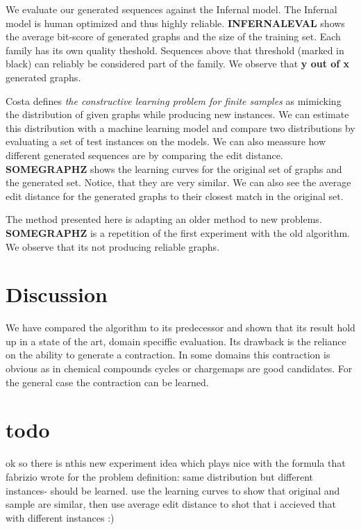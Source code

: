 \documentclass{article}
\begin{document}
We evaluate our generated sequences against the Infernal model.
The Infernal model is human optimized and thus highly reliable.
 \textbf{INFERNALEVAL} shows the average bit-score of generated graphs
and the size of the training set. Each family has its own quality theshold.
Sequences above that threshold (marked in black) can reliably be considered
part of the family. We observe that \textbf{y out of x} generated graphs.

Costa \cite{costa14} defines \emph{the constructive learning problem for finite samples} 
as mimicking the distribution of given graphs while producing new instances.
We can estimate this distribution with a machine learning
model and compare two distributions by evaluating a set of test instances
on the models. We can also meassure how different generated sequences
are by comparing the edit distance.
\textbf{SOMEGRAPHZ} shows the learning curves for the original set
of graphs and the generated set. Notice, that they are very similar.
We can also see the average edit distance for the generated graphs 
to their closest match in the original set.

The method presented here is adapting an older method to new problems.
\textbf{SOMEGRAPHZ} is a repetition of the first experiment with 
the old algorithm. We observe that its not producing reliable
graphs.

\section{Discussion} 
We have compared the algorithm to its predecessor and shown
that its result hold up in a state of the art, domain speciffic
evaluation. Its drawback is the reliance on the ability to 
generate a contraction. In some domains this contraction is 
obvious as in chemical compounds cycles or chargemaps are good candidates.
For the general case the contraction can be learned.

\section{todo}
ok so there is nthis new experiment idea which plays nice with 
the formula that fabrizio wrote for the problem definition:
same distribution but different instances- should be learned. 
use the learning curves to show that original and sample are 
similar, then use average edit distance to shot that i accieved that 
with different instances :) 


\end{document}

